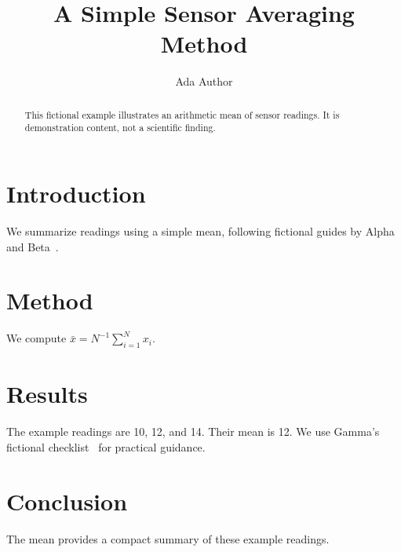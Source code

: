 \documentclass[journal]{IEEEtran}
\title{A Simple Sensor Averaging Method}
\author{Ada Author}
\begin{document}
\maketitle
\begin{abstract}
This fictional example illustrates an arithmetic mean of sensor readings.
It is demonstration content, not a scientific finding.
\end{abstract}
\section{Introduction}
We summarize readings using a simple mean, following fictional guides
by Alpha~\cite{guide} and Beta~\cite{method}.
\section{Method}\label{sec:method}
We compute $\bar{x}=N^{-1}\sum_{i=1}^{N}x_i$.
\section{Results}\label{sec:results}
The example readings are 10, 12, and 14. Their mean is 12.
We use Gamma's fictional checklist~\cite{legacy} for practical guidance.
\section{Conclusion}
The mean provides a compact summary of these example readings.


\end{document}
